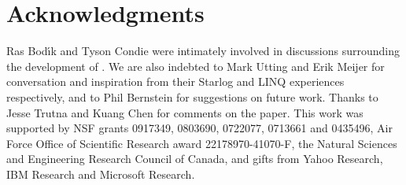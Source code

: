 \section{Acknowledgments}
Ras Bod\'{\i}k and Tyson Condie were intimately involved in
discussions surrounding the development of \lang.  We are also
indebted to Mark Utting and Erik Meijer for conversation and
inspiration from their Starlog and LINQ experiences respectively, and
to Phil Bernstein for suggestions on future work.  Thanks to Jesse
Trutna and Kuang Chen for comments on the paper. This work was
supported by NSF grants 0917349, 0803690, 0722077, 0713661 and
0435496, Air Force Office of Scientific Research award
22178970-41070-F, the Natural Sciences and Engineering Research
Council of Canada, and gifts from Yahoo Research, IBM Research and
Microsoft Research.
